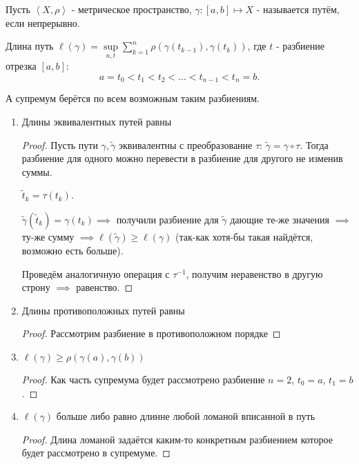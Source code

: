 
\begin{definition} \thmslashn 

    Пусть $\left<X, \rho\right>$ - метрическое пространство, $\gamma : [a, b] \mapsto X$ - называется путём, если непрерывно.

    Длина путь $\ell(\gamma) = \sup\limits_{n, t} \sum\limits_{k=1}^{n} \rho(\gamma(t_{k-1}), \gamma(t_{k}))$, где $t$ - разбиение отрезка $[a, b]$:
    \[ a = t_0 < t_1 < t_2 < \ldots < t_{n-1} < t_{n} = b .\]

    А супремум берётся по всем возможным таким разбиениям.
\end{definition}
\begin{properties} \thmslashn

    \begin{enumerate}
        \item Длины эквивалентных путей равны
            \begin{proof} \thmslashn
            
                Пусть пути $\gamma, \tilde{\gamma}$ эквивалентны с преобразование $\tau$: $\tilde{\gamma} = \gamma \circ \tau$. Тогда разбиение для одного можно перевести в разбиение для другого не изменив суммы.

                $\tilde{t}_{k} = \tau(t_{k})$.
                
                $\tilde{\gamma}(\tilde{t}_{k}) = \gamma(t_{k}) \implies $ получили разбиение для $\tilde{\gamma}$ дающие те-же значения $\implies$ ту-же сумму $\implies \ell(\tilde{\gamma}) \ge \ell(\gamma)$ (так-как хотя-бы такая найдётся, возможно есть больше).

                Проведём аналогичную операция с $\tau^{-1}$, получим неравенство в другую строну $\implies$ равенство.

            \end{proof}
        \item Длины противоположных путей равны
            \begin{proof} \thmslashn
            
                Рассмотрим разбиение в противоположном порядке
            \end{proof}
        \item $\ell(\gamma) \ge \rho(\gamma(a), \gamma(b))$
            \begin{proof} \thmslashn
            
                Как часть супремума будет рассмотрено разбиение $n=2$, $t_{0} = a$, $t_{1} = b$.
            \end{proof}
        \item $\ell(\gamma)$ больше либо равно длинне любой ломаной вписанной в путь
            \begin{proof} \thmslashn
            
                Длина ломаной задаётся каким-то конкретным разбиением которое будет рассмотрено в супремуме.
            \end{proof}
    \end{enumerate}
\end{properties}
